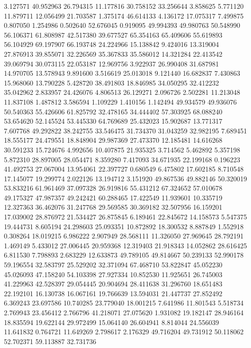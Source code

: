 3.127571
40.952963
26.794315
11.177816
30.758152
33.256644
3.858625
5.771120
11.879711
12.056499
21.703587
1.375174
46.614133
4.136172
17.075317
7.499875
0.807050
1.254986
0.502640
52.676045
0.919095
49.994393
49.980763
50.548990
56.106371
61.808987
42.517380
39.677527
65.354163
65.409606
55.619893
56.104929
69.197907
66.193748
24.224966
15.138842
9.424016
13.319004
27.876913
39.855071
32.226569
35.367833
35.586012
14.321284
22.413542
39.069794
30.073115
22.053187
12.969756
3.922937
26.990408
31.687981
14.970705
13.578943
9.891600
3.516619
25.013018
9.121440
16.682837
7.430863
15.968060
13.790228
5.428720
38.491803
18.846985
34.050295
32.412232
35.042962
2.833957
24.426076
4.806513
26.129271
2.096726
2.502281
11.213048
11.837108
1.487812
3.586594
1.109229
1.410156
1.142494
49.934579
49.936076
50.540363
55.426606
61.825792
32.478165
34.444402
57.303925
68.088240
53.654620
52.145524
53.445330
64.769689
25.432023
15.902687
13.771317
7.607768
49.292822
38.242755
33.546475
31.734370
31.043259
32.982195
7.689451
18.555177
24.479551
18.848904
29.987369
27.473370
12.185481
14.616268
30.591233
15.724676
4.992656
10.407875
21.935325
3.714562
5.462892
5.357198
5.872310
28.897005
28.054471
8.359280
7.417093
34.671935
22.199168
0.196223
41.492753
27.067004
13.954061
22.397727
0.680549
6.475802
17.602185
8.710548
17.145077
19.299774
2.022126
13.194712
3.151920
49.867536
49.882146
50.320019
53.833216
61.961469
37.097328
26.919816
55.431212
67.324652
57.010678
49.175327
47.987357
49.242421
60.288465
17.422549
11.939601
10.335719
12.327363
36.462076
31.247768
29.569585
30.369182
32.507956
16.159201
17.039002
28.876972
21.534427
26.875845
6.189461
22.845672
14.158573
5.547375
19.444731
8.605194
24.298603
25.093351
10.872892
18.300532
8.887849
1.552918
0.308264
18.019215
6.986222
2.907949
28.568111
11.326050
27.969645
28.792191
1.469149
5.433012
27.006445
20.959368
12.319403
21.918343
14.052862
28.616425
6.811530
7.798893
2.683229
12.633873
49.789105
49.814667
50.239133
52.990178
59.196554
32.583797
25.529202
32.371094
67.468710
53.822847
45.052230
45.026093
47.158240
54.103398
27.927334
10.852530
11.925651
26.745003
41.229963
42.528397
29.054445
20.904694
28.411638
31.296760
18.651483
22.192101
16.130738
16.067161
19.766639
13.594031
21.447737
27.852492
6.369243
23.697586
10.740285
23.779040
18.001215
7.641986
11.801543
5.518734
2.769943
23.456412
2.766796
41.218071
27.075620
1.931082
19.182147
28.946164
18.835594
19.622144
29.972499
15.064140
26.604941
8.814044
24.556039
11.641832
0.764721
11.649269
2.798617
2.176329
49.716204
49.731912
50.118062
52.702371
59.113887
32.731736
